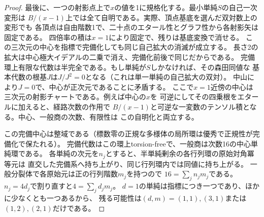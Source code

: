 \begin{proof}
最後に、一つの射影点上で$x$の値を1に規格化する。最小単純$S$の自己一次変形は
$B/(x-1)$上では全て自明である。実際、頂点基底を選んだ双対数上の変形でも
各頂点は自由階数1で、二十点のエタール性とグラフ性から各射影矢は固定である。
四倍率の積は$x=1$により固定で、残りは基底変換で消せる。
この三次元の中心を指標で完備化しても同じ自己拡大の消滅が成立する。
長さ2の拡大は中心極大イデアルの二乗で消え、完備化前後で同じだからである。
完備環上有限な代数は半完全である。もし単純が$S$しかなければ、その森田同値な
基本代数の根基$J$は$J/J^2=0$となる（これは単一単純の自己拡大の双対）。
中山により$J=0$で、中心が正次元であることに矛盾する。
ここで$x=1$近傍の中心は三次元の射影チャートである。例えば中心の$x$を
可逆にしてその四乗根をエタールに加えると、経路次数の作用で
$B/(x-1)$と可逆な一変数のテンソル積となる。中心、一般商の次数、有限性は
この自明化と両立する。

この完備中心は整域である（標数零の正規な多様体の局所環は優秀で正規性が完備化で保たれる）。
完備代数はこの環上torsion-freeで、一般商は次数16の中心単純環である。
各単純の次元を$n_j$とすると、半単純剰余の各行列環の原始対角冪等元は
直交した完備系へ持ち上がり、同じ行列環内では同値に持ち上がる。
一般分裂体で各原始元は正の行列階数$m_j$を持つので
$16=\sum_j n_jm_j$である。$n_j=4d_j$で割り直すと$4=\sum_j d_jm_j$。
$d=1$の単純は指標につき一つであり、ほかに少なくとも一つあるから、
残る可能性は$(d,m)=(1,1),(3,1)$または$(1,2),(2,1)$だけである。
\end{proof}
